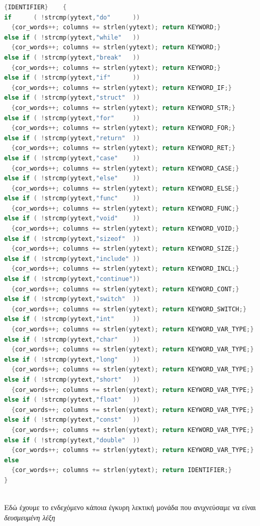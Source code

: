 \documentclass[14pt]{extarticle}
\begin{document}
\begin{lstlisting}[language=C]
{IDENTIFIER}    {
if      ( !strcmp(yytext,"do"      )) 
  {cor_words++; columns += strlen(yytext); return KEYWORD;}
else if ( !strcmp(yytext,"while"   )) 
  {cor_words++; columns += strlen(yytext); return KEYWORD;}
else if ( !strcmp(yytext,"break"   )) 
  {cor_words++; columns += strlen(yytext); return KEYWORD;}
else if ( !strcmp(yytext,"if"      )) 
  {cor_words++; columns += strlen(yytext); return KEYWORD_IF;}
else if ( !strcmp(yytext,"struct"  )) 
  {cor_words++; columns += strlen(yytext); return KEYWORD_STR;}
else if ( !strcmp(yytext,"for"     )) 
  {cor_words++; columns += strlen(yytext); return KEYWORD_FOR;}
else if ( !strcmp(yytext,"return"  )) 
  {cor_words++; columns += strlen(yytext); return KEYWORD_RET;}
else if ( !strcmp(yytext,"case"    )) 
  {cor_words++; columns += strlen(yytext); return KEYWORD_CASE;}
else if ( !strcmp(yytext,"else"    )) 
  {cor_words++; columns += strlen(yytext); return KEYWORD_ELSE;}
else if ( !strcmp(yytext,"func"    )) 
  {cor_words++; columns += strlen(yytext); return KEYWORD_FUNC;}
else if ( !strcmp(yytext,"void"    )) 
  {cor_words++; columns += strlen(yytext); return KEYWORD_VOID;}
else if ( !strcmp(yytext,"sizeof"  )) 
  {cor_words++; columns += strlen(yytext); return KEYWORD_SIZE;}
else if ( !strcmp(yytext,"include" )) 
  {cor_words++; columns += strlen(yytext); return KEYWORD_INCL;}
else if ( !strcmp(yytext,"continue")) 
  {cor_words++; columns += strlen(yytext); return KEYWORD_CONT;}
else if ( !strcmp(yytext,"switch"  )) 
  {cor_words++; columns += strlen(yytext); return KEYWORD_SWITCH;}
else if ( !strcmp(yytext,"int"     )) 
  {cor_words++; columns += strlen(yytext); return KEYWORD_VAR_TYPE;}
else if ( !strcmp(yytext,"char"    )) 
  {cor_words++; columns += strlen(yytext); return KEYWORD_VAR_TYPE;}
else if ( !strcmp(yytext,"long"    )) 
  {cor_words++; columns += strlen(yytext); return KEYWORD_VAR_TYPE;}
else if ( !strcmp(yytext,"short"   )) 
  {cor_words++; columns += strlen(yytext); return KEYWORD_VAR_TYPE;}
else if ( !strcmp(yytext,"float"   )) 
  {cor_words++; columns += strlen(yytext); return KEYWORD_VAR_TYPE;}
else if ( !strcmp(yytext,"const"   )) 
  {cor_words++; columns += strlen(yytext); return KEYWORD_VAR_TYPE;}
else if ( !strcmp(yytext,"double"  )) 
  {cor_words++; columns += strlen(yytext); return KEYWORD_VAR_TYPE;}
else
  {cor_words++; columns += strlen(yytext); return IDENTIFIER;}
}
\end{lstlisting}
\\
Εδώ έχουμε το ενδεχόμενο κάποια έγκυρη λεκτική μονάδα που ανιχνεύσαμε να είναι \emph{δευσμευμένη λέξη}
\end{document}
